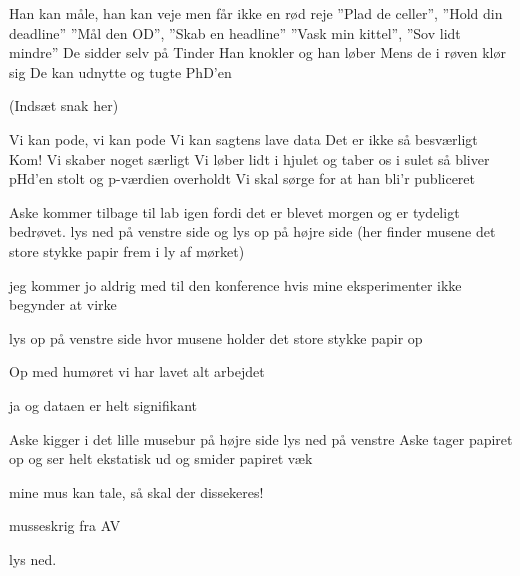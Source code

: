 \documentclass[a4paper,11pt]{article}
\begin{document}
\begin{song}
Han kan måle, han kan veje
men får ikke en rød reje
”Plad de celler”, ”Hold din deadline”
”Mål den OD”, ”Skab en headline”
”Vask min kittel”, ”Sov lidt mindre”
De sidder selv på Tinder
Han knokler og han løber
Mens de i røven klør sig
De kan udnytte og tugte
PhD'en

(Indsæt snak her)

Vi kan pode, vi kan pode
Vi kan sagtens lave data
Det er ikke så besværligt
Kom! Vi skaber noget særligt
Vi løber lidt i hjulet
og taber os i sulet
så bliver pHd'en stolt
og p-værdien overholdt
Vi skal sørge for at han bli'r publiceret

\end{song}

\begin{sketch}

\scene Aske kommer tilbage til lab igen fordi det er blevet morgen og er tydeligt bedrøvet. lys ned på venstre side og lys op på højre side (her finder musene det store stykke papir frem i ly af mørket)

 jeg kommer jo aldrig med til den konference hvis mine eksperimenter ikke begynder at virke

\scene lys op på venstre side hvor musene holder det store stykke papir op

 Op med humøret vi har lavet alt arbejdet

 ja og dataen er helt signifikant

Aske kigger i det lille musebur på højre side
lys ned på venstre
Aske tager papiret op og ser helt ekstatisk ud og smider papiret væk 

 mine mus kan tale, så skal der dissekeres! 

musseskrig fra AV 

lys ned. 

\end{sketch}
\end{document}
